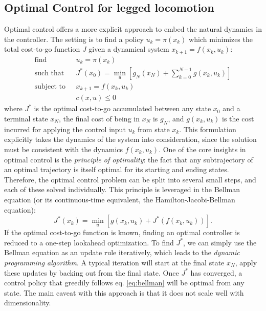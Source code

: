 \subsection{Optimal Control for legged locomotion}
Optimal control offers a more explicit approach to embed the natural dynamics in the controller.
The setting is to find a policy $u_k = \pi(x_k)$  which minimizes the total cost-to-go function $J$ given a dynamical system $x_{k+1} = f(x_k, u_k)$:
\begin{align*}
\text{find } & \, \, u_k = \pi(x_k) \\
\text{such that } & \, \, J^*(x_0) = \min_u \left[g_N(x_N) + \sum_{k=0}^{N-1}g(x_k, u_k)\right] \\
\text{subject to } & \, \, x_{k+1} = f(x_k, u_k) \\
& \, \, c(x, u) \leq 0
\end{align*}
where $J^*$ is the optimal cost-to-go accumulated between any state $x_0$ and a terminal state $x_N$, the final cost of being in $x_N$ is $g_N$, and $g(x_k, u_k)$ is the cost incurred for applying the control input $u_k$ from state $x_k$.
This formulation explicitly takes the dynamics of the system into consideration, since the solution must be consistent with the dynamics $f(x_k, u_k)$.
One of the core insights in optimal control is the \emph{principle of optimality}: the fact that any subtrajectory of an optimal trajectory is itself optimal for its starting and ending states.
Therefore, the optimal control problem can be split into several small steps, and each of these solved individually.
This principle is leveraged in the Bellman equation (or its continuous-time equivalent, the Hamilton-Jacobi-Bellman equation):
\begin{equation}\label{eq:bellman}
J^*(x_k) = \min_u\left[g(x_k,u_k) + J^*(f(x_k, u_k)) \right].
\end{equation}
If the optimal cost-to-go function is known, finding an optimal controller is reduced to a one-step lookahead optimization.
To find $J^*$, we can simply use the Bellman equation as an update rule iteratively, which leads to the \emph{dynamic programming algorithm}. A typical iteration will start at the final state $x_N$, apply these updates by backing out from the final state. Once $J^*$ has converged, a control policy that greedily follows eq. \ref{eq:bellman} will be optimal from any state.
The main caveat with this approach is that it does not scale well with dimensionality. \par
